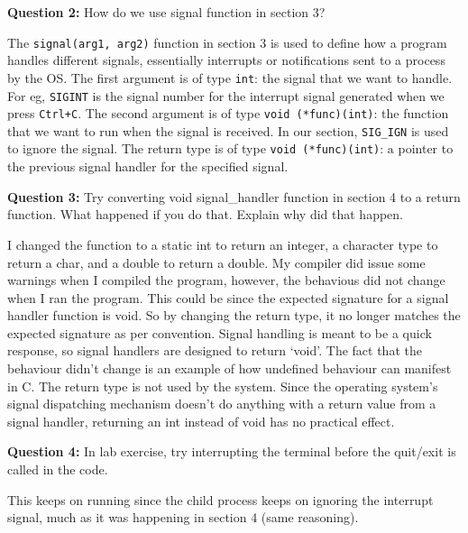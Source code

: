 \documentclass[addpoints]{exam}
\begin{document}
\begin{questions}
    \question
    \textbf{Question 2:} How do we use signal function in section 3?
    \begin{solution}
        The \texttt{signal(arg1, arg2)} function in section 3 is used to define how a program handles different signals, essentially interrupts or notifications sent to a process by the OS. The first argument is of type \texttt{int}: the signal that we want to handle. For eg, \texttt{SIGINT} is the signal number for the interrupt signal generated when we press \texttt{Ctrl+C}. The second argument is of type \texttt{void (*func)(int)}: the function that we want to run when the signal is received. In our section, \texttt{SIG\_IGN} is used to ignore the signal. The return type is of type \texttt{void (*func)(int)}: a pointer to the previous signal handler for the specified signal. 
    \end{solution}

    \question
    \textbf{Question 3:} Try converting void signal\_handler function in section 4 to a return function. What happened if you do that. Explain why did that happen.
    \begin{solution}
        I changed the function to a static int to return an integer, a character type to return a char, and a double to return a double.
        My compiler did issue some warnings when I compiled the program, however, the behavious did not change when I ran the program. This could be since the expected signature for a signal handler function is void. So by changing the return type, it no longer matches the expected signature as per convention. Signal handling is meant to be a quick response, so signal handlers are designed to return `void'. The fact that the behaviour didn't change is an example of how undefined behaviour can manifest in C. The return type is not used by the system. Since the operating system's signal dispatching mechanism doesn't do anything with a return value from a signal handler, returning an int instead of void has no practical effect. 
    \end{solution}

    \question
    \textbf{Question 4:} In lab exercise, try interrupting the terminal before the quit/exit is called in the code.
    \begin{solution}
        This keeps on running since the child process keeps on ignoring the interrupt signal, much as it was happening in section 4 (same reasoning). 
    \end{solution}

        
    
\end{questions}
\end{document}
